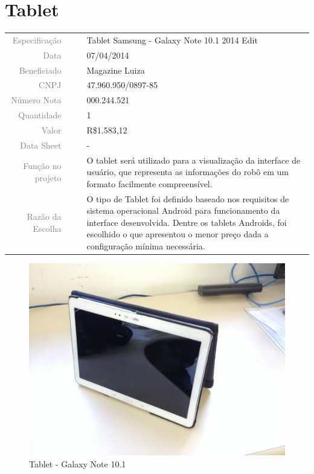 

\section{Tablet}
\label{tablet}


\begin{table}[ht!]

	\begin{tabular}{r l|l p{12cm} }
		
		\textcolor{gray}{Especificação} &&& 	{Tablet Samsung - Galaxy Note 10.1 2014
		Edit }\\
		\textcolor{gray}{Data} &&& 				{07/04/2014}\\
        \textcolor{gray}{Beneficiado} &&&		{Magazine Luiza} \\
        \textcolor{gray}{CNPJ} &&& 				{47.960.950/0897-85} \\
        \textcolor{gray}{Número Nota} &&& 		{000.244.521} \\
		\textcolor{gray}{Quantidade} &&& 		{1} \\
		\textcolor{gray}{Valor} &&& 			{R\$1.583,12} \\
		\textcolor{gray}{Data Sheet} &&& 		{-} \\

		\textcolor{gray}{Função no projeto} &&& {O tablet será utilizado para a visualização da interface de usuário, que representa as informações do robô em um formato facilmente compreensível.} \\
		\textcolor{gray}{Razão da Escolha} &&& {O tipo de Tablet foi definido baseado nos requisitos de sistema operacional Android para funcionamento da interface desenvolvida. Dentre os tablets Androids, foi escolhido o que apresentou o menor preço dada a configuração mínima necessária.}
		

	\end{tabular}
\end{table}

\newpage

\begin{figure}[h!]
 \centering
 \includegraphics[width=1\columnwidth]{Tablet/foto}
 \caption{Tablet - Galaxy Note 10.1 }
\end{figure}

